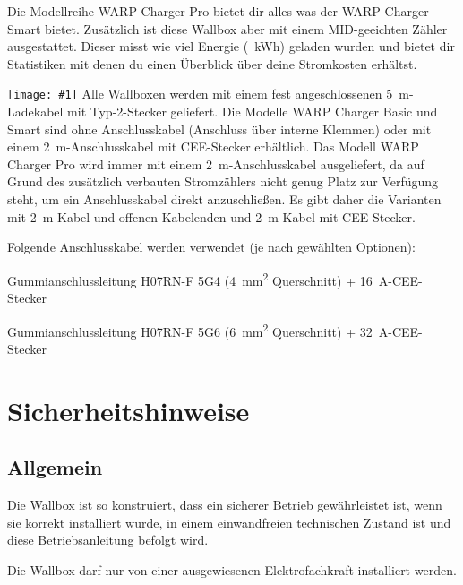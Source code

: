\documentclass[a4paper,10pt]{article}
\newcommand{\hint}[1]{\begin{tcolorbox}[colback=boxgray,colframe=black,coltext=
white,title=Hinweis]#1\end{tcolorbox}}
\newcommand{\gfx}[1]{\texttt{[image: \#1]}}
\begin{document}
\begin{multicols*}{2}
	Die Modellreihe WARP Charger Pro bietet dir alles was der WARP Charger Smart
	bietet. Zusätzlich ist diese Wallbox aber mit einem MID-geeichten Zähler
	ausgestattet. Dieser misst wie viel Energie (\SI{}{\kWh}) geladen
	wurden und bietet dir Statistiken mit denen du einen Überblick über deine
	Stromkosten erhältst.

	\gfx{./img/resized/type_2_connector_ready}
	Alle Wallboxen werden mit einem fest angeschlossenen
	\SI{5}{\meter}-Ladekabel mit Typ-2-Stecker geliefert. Die Modelle WARP
	Charger Basic und Smart sind ohne Anschlusskabel (Anschluss über interne
	Klemmen) oder mit einem \SI{2}{\meter}-Anschlusskabel mit CEE-Stecker
	erhältlich. Das Modell WARP Charger Pro wird immer mit einem
	\SI{2}{\meter}-Anschlusskabel ausgeliefert, da auf Grund des zusätzlich
	verbauten Stromzählers nicht genug Platz zur Verfügung steht, um ein
	Anschlusskabel direkt anzuschließen. Es gibt daher die Varianten mit
	\SI{2}{\meter}-Kabel und offenen Kabelenden und
	\SI{2}{\meter}-Kabel mit CEE-Stecker.

	Folgende Anschlusskabel werden verwendet (je nach gewählten Optionen):

	\begin{description}[leftmargin=!,labelwidth=\widthof{\textbf{\SI{22}{\kilo\watt}}}]
		\item[\SI{11}{\kilo\watt}]Gummianschlussleitung H07RN-F 5G4
		      (\SI{4}{\square\milli\meter}
		      Querschnitt) + \SI{16}{\ampere}-CEE-Stecker
		\item[\SI{22}{\kilo\watt}]Gummianschlussleitung H07RN-F 5G6
		      (\SI{6}{\square\milli\meter}
		      Querschnitt) + \SI{32}{\ampere}-CEE-Stecker
	\end{description}

	\section{Sicherheitshinweise}
	\subsection{Allgemein}
	Die Wallbox ist so konstruiert, dass ein sicherer Betrieb gewährleistet ist,
	wenn sie korrekt installiert wurde, in einem einwandfreien technischen Zustand
	ist und diese Betriebsanleitung befolgt wird. \hint{Die Wallbox darf nur von einer ausgewiesenen Elektrofachkraft installiert
		werden.}


\end{multicols*}
\end{document}
